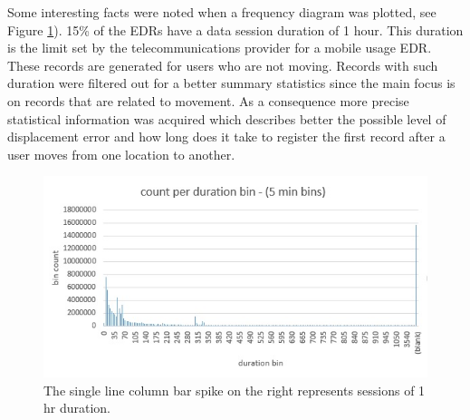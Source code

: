\documentclass[12pt, a4paper]{report}
\theoremstyle{definition}
\theoremstyle{definition}%
\theoremstyle{definition}%
\theoremstyle{definition}%
\theoremstyle{definition}%
\theoremstyle{definition}%
\begin{document}
\begin{table}[h]
	\centering
	\caption{Basic summary statistics of main EDR dataset.} 
	\label{table:summary statistics}
\end{table}


Some interesting facts were noted when a frequency diagram was plotted, see Figure \ref{fig:data_session_duration_bin_count}). 15\% of the EDRs have a data session duration of 1 hour. This duration is the limit set by the telecommunications provider for a mobile usage EDR. These records are generated for users who are not moving. Records with such duration were filtered out for a better summary statistics since the main focus is on records that are related to movement. As a consequence more precise statistical information was acquired which describes better the possible level of displacement error and how long does it take to register the first record after a user moves from one location to another.

\begin{figure}	
	\includegraphics[scale=0.75]{data_session_duration_bin_count.jpg}
	\centering
	\caption[Data session duration distribution]{The single line column bar spike on the right represents sessions of 1 hr duration.}
	\label{fig:data_session_duration_bin_count}
\end{figure}
\end{document}
